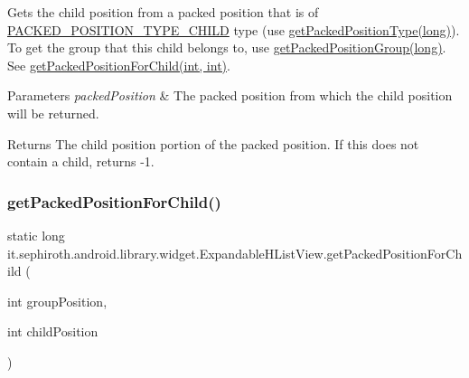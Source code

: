 Gets the child position from a packed position that is of \hyperlink{classit_1_1sephiroth_1_1android_1_1library_1_1widget_1_1_expandable_h_list_view_afbbb060d5013f38b6aef1c2f69e14524}{P\+A\+C\+K\+E\+D\+\_\+\+P\+O\+S\+I\+T\+I\+O\+N\+\_\+\+T\+Y\+P\+E\+\_\+\+C\+H\+I\+LD} type (use \hyperlink{classit_1_1sephiroth_1_1android_1_1library_1_1widget_1_1_expandable_h_list_view_ae574c6efbf83f1bb3d588c13a7bd0ef1}{get\+Packed\+Position\+Type(long)}). To get the group that this child belongs to, use \hyperlink{classit_1_1sephiroth_1_1android_1_1library_1_1widget_1_1_expandable_h_list_view_ada2257e0f53c0c4dfe19c7e0fa155aad}{get\+Packed\+Position\+Group(long)}. See \hyperlink{classit_1_1sephiroth_1_1android_1_1library_1_1widget_1_1_expandable_h_list_view_a37af0955cf4697ca1af59fbceff91fda}{get\+Packed\+Position\+For\+Child(int, int)}.


\begin{DoxyParams}{Parameters}
{\em packed\+Position} & The packed position from which the child position will be returned. \\
\hline
\end{DoxyParams}
\begin{DoxyReturn}{Returns}
The child position portion of the packed position. If this does not contain a child, returns -\/1. 
\end{DoxyReturn}
\mbox{\label{classit_1_1sephiroth_1_1android_1_1library_1_1widget_1_1_expandable_h_list_view_a37af0955cf4697ca1af59fbceff91fda}} 
\subsubsection{\texorpdfstring{get\+Packed\+Position\+For\+Child()}{getPackedPositionForChild()}}
{\footnotesize\ttfamily static long it.\+sephiroth.\+android.\+library.\+widget.\+Expandable\+H\+List\+View.\+get\+Packed\+Position\+For\+Child (\begin{DoxyParamCaption}\item[{int}]{group\+Position,  }\item[{int}]{child\+Position }\end{DoxyParamCaption})\hspace{0.3cm}{\ttfamily [static]}}

